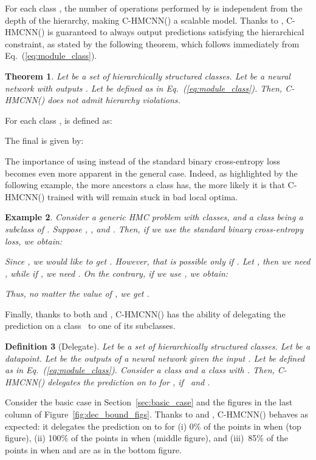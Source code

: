 \documentclass{article}
\newcommand{\module}{\text{MCM}}
\newcommand{\loss}{\text{MCLoss}}
\newcommand{\system}[1]{C-HMCNN(#1)}
\newtheorem{theorem}{Theorem}[section]
\newtheorem{definition}[theorem]{Definition}
\newtheorem{example}[theorem]{Example}
\begin{document}
For each class , the number of operations performed by  is independent from the depth of the hierarchy, making \system{} a scalable model. Thanks to , \system{} is guaranteed to always output predictions satisfying the hierarchical constraint, as stated by the following theorem, which follows immediately from Eq.~(\ref{eq:module_class}). 

\begin{theorem}\label{theorem}
Let  be a set of hierarchically structured classes. Let  be a neural network with outputs . Let 
 be defined as in Eq.~(\ref{eq:module_class}).
Then, \system{} does not admit hierarchy violations.
\end{theorem}

For each class ,   is defined as:

The final  is given by:


 The importance of using \loss{} instead of the standard binary cross-entropy loss  becomes even more apparent in the general case. Indeed, as highlighted by the following example, the more ancestors a class has, the more likely it is that \system{} trained with  will remain stuck in bad local optima.
\begin{example}{\rm
Consider a generic HMC problem with  classes, and a class  being a subclass of . Suppose , , and . Then, if we use the standard binary cross-entropy loss, we obtain:

Since , we would like to get  . However, that is possible only if . Let , then we need , while if , we need . On the contrary, if we use \loss{}, we obtain:

Thus, no matter the value of , we get .
}
\end{example}

Finally, thanks to both  and , \system{} has the ability of delegating the prediction on a class~ to one of its subclasses.
\begin{definition}[Delegate]{\rm 
Let  be a set of hierarchically structured classes. Let  be a datapoint. Let  be the outputs of a neural network  given the input . Let 
 be defined as in Eq.~(\ref{eq:module_class}).
 Consider a class  and a class  with . Then, \system{} \emph{delegates} the prediction on   to  for , if~ and .} 
\end{definition}
Consider the basic case in Section~\ref{sec:basic_case} and the figures in the last column of  Figure~\ref{fig:dec_bound_figs}. Thanks to \module{} and \loss{}, \system{} behaves as expected: it delegates the prediction on  to  for (i) 0\% of the points in  when  (top figure), (ii) 100\% of the points in  when  (middle figure), and (iii)~85\% of the points in  when  and  are as in the bottom figure.
\end{document}
